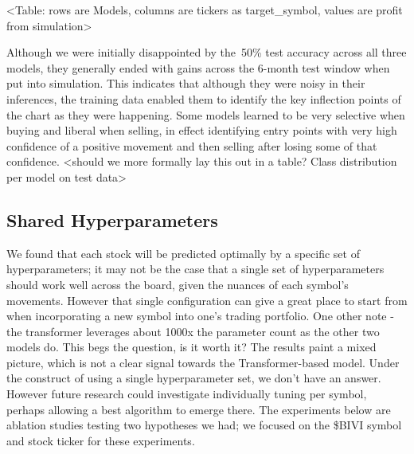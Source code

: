 \documentclass[10pt,twocolumn,letterpaper]{article}
\begin{document}
<Table: rows are Models, columns are tickers as target\_symbol, values are profit from simulation>

\begin{table}
\begin{center}
\end{center}
    \caption{Data splits and time frames.}
\label{tab:trainingsplits}
\end{table}

Although we were initially disappointed by the~50\% test accuracy across all three models, they generally ended with gains across the 6-month test window when put into simulation. This indicates that although they were noisy in their inferences, the training data enabled them to identify the key inflection points of the chart as they were happening. Some models learned to be very selective when buying and liberal when selling, in effect identifying entry points with very high confidence of a positive movement and then selling after losing some of that confidence.  <should we more formally lay this out in a table? Class distribution per model on test data>

\subsection{Shared Hyperparameters}

We found that each stock will be predicted optimally by a specific set of hyperparameters; it may not be the case that a single set of hyperparameters should work well across the board, given the nuances of each symbol’s movements. However that single configuration can give a great place to start from when incorporating a new symbol into one’s trading portfolio.
One other note - the transformer leverages about 1000x the parameter count as the other two models do. This begs the question, is it worth it? The results paint a mixed picture, which is not a clear signal towards the Transformer-based model. Under the construct of using a single hyperparameter set, we don’t have an answer. However future research could investigate individually tuning per symbol, perhaps allowing a best algorithm to emerge there.
The experiments below are ablation studies testing two hypotheses we had; we focused on the \$BIVI symbol and stock ticker for these experiments.
\end{document}
